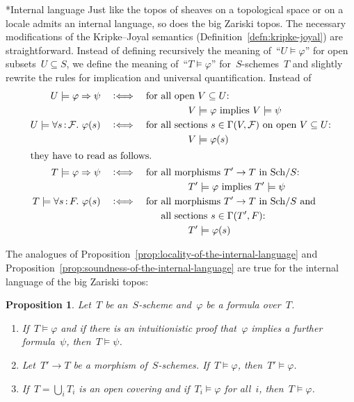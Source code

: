 \documentclass[10pt,reqno,a4paper]{amsbook}
\makeatletter
\theoremstyle{definition}
\theoremstyle{plain}
\newtheorem{prop}[defn]{Proposition}
\theoremstyle{remark}
\newcommand{\F}{\mathcal{F}}
\newcommand{\Sch}{\mathrm{Sch}}
\newcommand{\?}{\,{:}\,}
\renewcommand{\_}{\mathpunct{.}\,}
\newcommand{\Ll}{\vcentcolon\Longleftrightarrow}
\newcommand{\nocontentsline}[3]{}
\newcommand{\tocless}[1]{\let\addcontentsline=\nocontentsline}
\def\subsection{\@startsection{subsection}{2}%
  {0pt}{.5\linespacing\@plus.7\linespacing}{-.5em}%
  {\normalfont\bfseries}}
\makeatother
\begin{document}
{\tocless

\subsection*{Internal language} Just like the topos of sheaves on a topological
space or on a locale admits an internal language, so does the big Zariski topos.
The necessary modifications of the Kripke--Joyal semantics
(Definition~\ref{defn:kripke-joyal}) are straightforward. Instead of
defining recursively the meaning of~``$U \models \varphi$'' for open subsets~$U
\subseteq S$, we define the meaning of~``$T \models \varphi$''
for~$S$-schemes~$T$ and slightly rewrite the rules for implication and universal quantification.
Instead of
\begin{align*}
  U \models \varphi \Rightarrow \psi \quad&\Ll\quad
  \text{for all open~$V \subseteq U$:} \\
  &\qquad\qquad\qquad\qquad\text{$V \models \varphi$ implies $V \models \psi$} \\
  U \models \forall s\?\F\_ \varphi(s) \quad&\Ll\quad
  \text{for all sections~$s \in \Gamma(V, \F)$ on open $V \subseteq U$:} \\
  &\qquad\qquad\qquad\qquad V \models \varphi(s) \\
\intertext{they have to read as follows.}
  T \models \varphi \Rightarrow \psi \quad&\Ll\quad
  \text{for all morphisms~$T' \to T$ in~$\Sch/S$:} \\
  &\qquad\qquad\qquad\qquad\text{$T' \models \varphi$ implies $T' \models \psi$} \\
  T \models \forall s\?F\_ \varphi(s) \quad&\Ll\quad
  \text{for all morphisms~$T' \to T$ in~$\Sch/S$ and} \\
  &\phantom{{}\Ll\quad\text{for }} \text{all sections~$s \in \Gamma(T', F)$:} \\
  &\qquad\qquad\qquad\qquad T' \models \varphi(s)
\end{align*}

The analogues of Proposition~\ref{prop:locality-of-the-internal-language} and
Proposition~\ref{prop:soundness-of-the-internal-language} are true for the internal
language of the big Zariski topos:

\begin{prop}\label{prop:basic-properties-language-big}
Let~$T$ be an~$S$-scheme and~$\varphi$ be a formula over~$T$.
\begin{enumerate}
\item If~$T \models \varphi$ and if there is an intuitionistic proof
that~$\varphi$ implies a further formula~$\psi$, then~$T \models \psi$.
\item Let~$T' \to T$ be a morphism of~$S$-schemes. If~$T \models \varphi$,
then~$T' \models \varphi$.
\item If~$T = \bigcup_i T_i$ is an open covering and if~$T_i \models \varphi$
for all~$i$, then~$T \models \varphi$.
\end{enumerate}
\end{prop}

}
\end{document}

